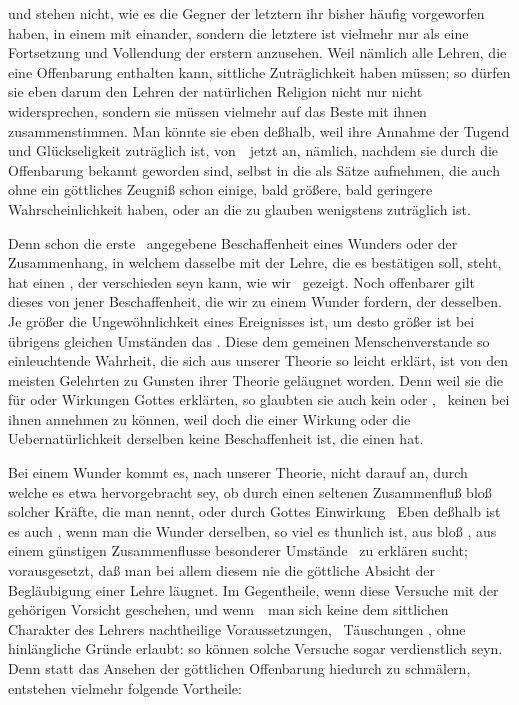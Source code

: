 \begin{aufza}
\item {} und  stehen nicht, wie es die Gegner der letztern ihr bisher häufig vorgeworfen haben, in einem  mit einander, sondern die letztere ist vielmehr nur als eine Fortsetzung und Vollendung der erstern anzusehen. Weil nämlich alle Lehren, die eine Offenbarung enthalten kann, sittliche Zuträglichkeit haben müssen; so dürfen sie eben darum den Lehren der natürlichen Religion nicht nur nicht widersprechen, sondern sie müssen vielmehr auf das Beste mit ihnen zusammenstimmen. Man könnte sie eben deßhalb, weil ihre Annahme der Tugend und Glückseligkeit zuträglich ist, von~\ jetzt an, nämlich, nachdem sie durch die Offenbarung bekannt geworden sind, selbst in die  als Sätze aufnehmen, die auch ohne ein göttliches Zeugniß schon einige, bald größere, bald geringere Wahrscheinlichkeit haben, oder an die zu glauben wenigstens zuträglich ist.
\item {} Denn schon die erste \ angegebene Beschaffenheit eines Wunders oder der Zusammenhang, in welchem dasselbe mit der Lehre, die es bestätigen soll, steht, hat einen , der verschieden seyn kann, wie wir \ gezeigt. Noch offenbarer gilt dieses von jener  Beschaffenheit, die wir zu einem Wunder fordern, der  desselben. Je größer die Ungewöhnlichkeit eines Ereignisses ist, um desto größer ist bei übrigens gleichen Umständen das . Diese dem gemeinen Menschenverstande so einleuchtende Wahrheit, die sich aus unserer Theorie so leicht erklärt, ist von den meisten Gelehrten zu Gunsten ihrer Theorie geläugnet worden. Denn weil sie die  für  oder  Wirkungen Gottes erklärten, so glaubten sie auch kein  oder , \dh\ keinen  bei ihnen annehmen zu können, weil doch die  einer Wirkung oder die Uebernatürlichkeit derselben keine Beschaffenheit ist, die einen  hat.
\item Bei einem Wunder kommt es, nach unserer Theorie, nicht darauf an, durch welche  es etwa hervorgebracht sey, ob durch einen seltenen Zusammenfluß bloß solcher Kräfte, die man  nennt, oder durch Gottes  Einwirkung \udgl\  Eben deßhalb ist es auch , wenn man die Wunder derselben, so viel es thunlich ist, aus bloß , aus einem günstigen Zusammenflusse besonderer Umstände \udgl\  zu erklären sucht; vorausgesetzt, daß man bei allem diesem nie die göttliche Absicht der Begläubigung einer Lehre läugnet. Im Gegentheile, wenn diese Versuche mit der gehörigen Vorsicht geschehen, und wenn~\ man sich keine dem sittlichen Charakter des Lehrers nachtheilige Voraussetzungen, \zB\ Täuschungen \udgl , ohne hinlängliche Gründe erlaubt: so können solche Versuche sogar verdienstlich seyn. Denn statt das Ansehen der göttlichen Offenbarung hiedurch zu schmälern, entstehen vielmehr folgende Vortheile:

\end{aufza}
